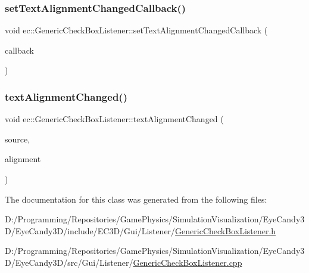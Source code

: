 \subsubsection{\texorpdfstring{set\+Text\+Alignment\+Changed\+Callback()}{setTextAlignmentChangedCallback()}}
{\footnotesize\ttfamily void ec\+::\+Generic\+Check\+Box\+Listener\+::set\+Text\+Alignment\+Changed\+Callback (\begin{DoxyParamCaption}\item[{const \mbox{\hyperlink{classec_1_1_generic_check_box_listener_ab297fca8dea2b6edefe0c8d97c24c090}{Text\+Alignment\+Changed\+\_\+\+Callback}} \&}]{callback }\end{DoxyParamCaption})}

\mbox{\label{classec_1_1_generic_check_box_listener_abe00afb238e730d9e88c14e540f209ca}} 
\subsubsection{\texorpdfstring{text\+Alignment\+Changed()}{textAlignmentChanged()}}
{\footnotesize\ttfamily void ec\+::\+Generic\+Check\+Box\+Listener\+::text\+Alignment\+Changed (\begin{DoxyParamCaption}\item[{agui\+::\+Check\+Box $\ast$}]{source,  }\item[{agui\+::\+Area\+Alignment\+Enum}]{alignment }\end{DoxyParamCaption})\hspace{0.3cm}{\ttfamily [override]}}



The documentation for this class was generated from the following files\+:\begin{DoxyCompactItemize}
\item 
D\+:/\+Programming/\+Repositories/\+Game\+Physics/\+Simulation\+Visualization/\+Eye\+Candy3\+D/\+Eye\+Candy3\+D/include/\+E\+C3\+D/\+Gui/\+Listener/\mbox{\hyperlink{_generic_check_box_listener_8h}{Generic\+Check\+Box\+Listener.\+h}}\item 
D\+:/\+Programming/\+Repositories/\+Game\+Physics/\+Simulation\+Visualization/\+Eye\+Candy3\+D/\+Eye\+Candy3\+D/src/\+Gui/\+Listener/\mbox{\hyperlink{_generic_check_box_listener_8cpp}{Generic\+Check\+Box\+Listener.\+cpp}}\end{DoxyCompactItemize}
